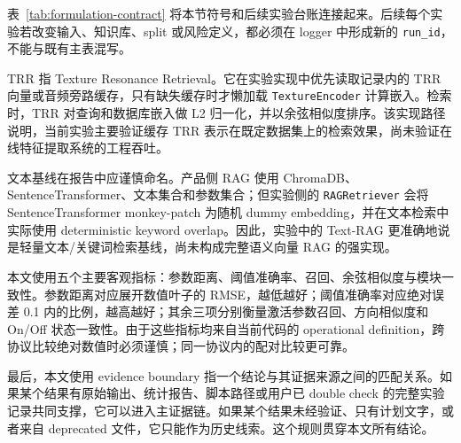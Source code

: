 \begin{table}[H]
	\centering
	\caption{检索式可编辑参数控制的 formal contract。}
	\label{tab:formulation-contract}
	\small
\end{table}

表~\ref{tab:formulation-contract} 将本节符号和后续实验台账连接起来。后续每个实验若改变输入、知识库、split 或风险定义，都必须在 logger 中形成新的 \texttt{run\_id}，不能与既有主表混写。

TRR 指 Texture Resonance Retrieval。它在实验实现中优先读取记录内的 TRR 向量或音频旁路缓存，只有缺失缓存时才懒加载 \texttt{TextureEncoder} 计算嵌入。检索时，TRR 对查询和数据库嵌入做 L2 归一化，并以余弦相似度排序。该实现路径说明，当前实验主要验证缓存 TRR 表示在既定数据集上的检索效果，尚未验证在线特征提取系统的工程吞吐。

文本基线在报告中应谨慎命名。产品侧 RAG 使用 ChromaDB、SentenceTransformer、文本集合和参数集合；但实验侧的 \texttt{RAGRetriever} 会将 SentenceTransformer monkey-patch 为随机 dummy embedding，并在文本检索中实际使用 deterministic keyword overlap。因此，实验中的 Text-RAG 更准确地说是轻量文本/关键词检索基线，尚未构成完整语义向量 RAG 的强实现。

本文使用五个主要客观指标：参数距离、阈值准确率、召回、余弦相似度与模块一致性。参数距离对应展开数值叶子的 RMSE，越低越好；阈值准确率对应绝对误差 0.1 内的比例，越高越好；其余三项分别衡量激活参数召回、方向相似度和 On/Off 状态一致性。由于这些指标均来自当前代码的 operational definition，跨协议比较绝对数值时必须谨慎；同一协议内的配对比较更可靠。

最后，本文使用 evidence boundary 指一个结论与其证据来源之间的匹配关系。如果某个结果有原始输出、统计报告、脚本路径或用户已 double check 的完整实验记录共同支撑，它可以进入主证据链。如果某个结果未经验证、只有计划文字，或者来自 deprecated 文件，它只能作为历史线索。这个规则贯穿本文所有结论。
